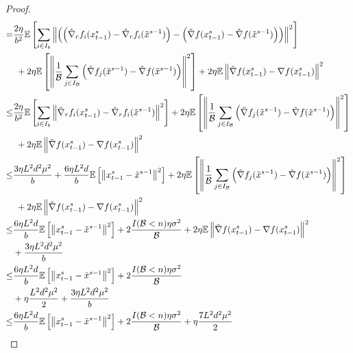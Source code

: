 \documentclass[iicol,sn-basic]{sn-jnl}
\theoremstyle{thmstyleone}%
\theoremstyle{thmstyletwo}%
\theoremstyle{thmstylethree}%
\newcommand*{\E}{\mathbb{E}}
\newcommand{\norm}[1]{\left\lVert#1\right\rVert}
\begin{document}
\begin{proof}
\begin{align}
   = &\notag\frac{2\eta}{b^2}\E\left[\sum_{i\in I_b}\norm{\left(\left(\hat{\nabla}_r f_i(x_{t-1}^s)-\hat{\nabla}_r f_i(\tilde{x}^{s-1})\right) - \left({\hat{\nabla}} f(x_{t-1}^s) - \hat{\nabla} f(\tilde{x}^{s-1}) \right)\right)}^2\right]\\
   &\,\, \label{RandSGE-var-estimate-lem-3}+ 2\eta \E \left[ \norm{\frac{1}{\mathcal{B}}\sum_{j\in I_\mathcal{B}}\left(\hat{\nabla} f_j(\tilde{x}^{s-1}) - \hat{\nabla} f(\tilde{x}^{s-1})\right)}^2\right]+2\eta \E \norm{\hat{\nabla} f(x_{t-1}^s)-\nabla f(x_{t-1}^s)}^2\\
   \leq  &\frac{2\eta}{b^2}\E\left[\sum_{i\in I_b}\norm{\hat{\nabla}_r f_i(x_{t-1}^s)-\hat{\nabla}_r f_i(\tilde{x}^{s-1})}^2\right]+ 2\eta \E \left[ \norm{\frac{1}{\mathcal{B}}\sum_{j\in I_{\mathcal{B}}}\left(\hat{\nabla} f_j(\tilde{x}^{s-1}) - \hat{\nabla} f(\tilde{x}^{s-1})\right)}^2\right]\notag\\
   &\,\,\label{RandSGE-var-estimate-lem-4}+2\eta \E \norm{\hat{\nabla} f(x_{t-1}^s)-\nabla f(x_{t-1}^s)}^2\\
    \leq  &\frac{3 \eta L^2 d^2 \mu^2}{b} + \frac{6\eta L^2 d}{b}\E\left[\norm{x_{t-1}^s-\tilde{x}^{s-1}}^2\right]+ 2\eta \E \left[ \norm{\frac{1}{\mathcal{B}}\sum_{j\in I_{\mathcal{B}}}\left(\hat{\nabla} f_j(\tilde{x}^{s-1}) - \hat{\nabla} f(\tilde{x}^{s-1})\right)}^2\right]\notag\\
   &\,\,\label{RandSGE-var-estimate-lem-5}+2\eta \E \norm{\hat{\nabla} f(x_{t-1}^s)-\nabla f(x_{t-1}^s)}^2\\
   \leq  &\label{RandSGE-var-estimate-lem-6p}\frac{6\eta L^2d}{b}\E\left[\norm{x_{t-1}^s-\tilde{x}^{s-1}}^2\right]+ 2\frac{I(\mathcal{B} < n)\eta \sigma ^2}{\mathcal{B}}+2\eta \E \norm{\hat{\nabla} f(x_{t-1}^s)-\nabla f(x_{t-1}^s)}^2\notag\\
   & + \frac{3 \eta L^2 d^2 \mu^2}{b}\\
   \leq  &\frac{6\eta L^2 d}{b}\E\left[\norm{x_{t-1}^s-\tilde{x}^{s-1}}^2\right]+ 2\frac{I(\mathcal{B} < n)\eta \sigma ^2}{\mathcal{B}}\notag\\
   &\label{RandSGE-var-estimate-lem-6} +\eta \frac{L^2d^2\mu^2}{2}+ \frac{3 \eta L^2 d^2 \mu^2}{b}\\
   \leq  &\label{RandSGE-var-estimate-lem-7}\frac{6\eta L^2 d}{b}\E\left[\norm{x_{t-1}^s-\tilde{x}^{s-1}}^2\right]+ 2\frac{I(\mathcal{B} < n)\eta \sigma ^2}{\mathcal{B}}+\eta \frac{7L^2 d^2 \mu^2}{2} 
 \end{align}

\end{proof}
\end{document}
